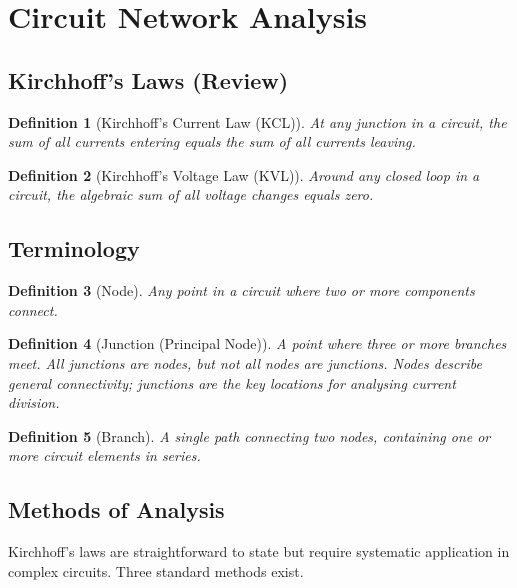 \documentclass{article}
\newtheorem{definition}{Definition}
\begin{document}
\section{Circuit Network Analysis}

\subsection{Kirchhoff's Laws (Review)}

\begin{definition}[Kirchhoff's Current Law (KCL)]
    At any junction in a circuit, the sum of all currents entering equals the sum of all currents leaving.
\end{definition}

\begin{definition}[Kirchhoff's Voltage Law (KVL)]
    Around any closed loop in a circuit, the algebraic sum of all voltage changes equals zero.
\end{definition}

\subsection{Terminology}

\begin{definition}[Node]
    Any point in a circuit where two or more components connect.
\end{definition}
\begin{definition}[Junction (Principal Node)]
    A point where three or more branches meet. All junctions are nodes, but not all nodes are junctions. Nodes describe general connectivity; junctions are the key locations for analysing current division.
\end{definition}
\begin{definition}[Branch]
    A single path connecting two nodes, containing one or more circuit elements in series.
\end{definition}

\subsection{Methods of Analysis}

Kirchhoff's laws are straightforward to state but require systematic application in complex circuits. Three standard methods exist.
\end{document}
